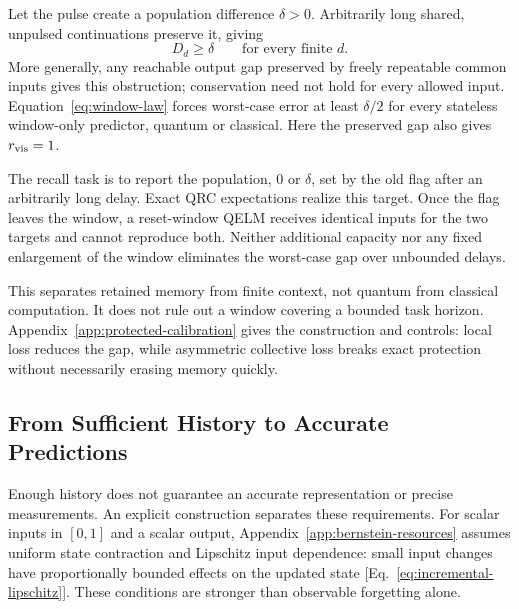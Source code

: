 Let the pulse create a population difference $\delta>0$. Arbitrarily long
shared, unpulsed continuations preserve it, giving
\begin{equation}
 D_d\geq\delta\qquad\text{for every finite }d.
 \label{eq:protected-mode}
\end{equation}
More generally, any reachable output gap preserved by freely repeatable
common inputs gives this obstruction; conservation need not hold for every
allowed input. Equation~\eqref{eq:window-law} forces worst-case error at
least $\delta/2$ for every stateless window-only predictor, quantum or
classical. Here the preserved gap also gives $r_{\rm vis}=1$.

The recall task is to report the population, $0$ or $\delta$, set by the
old flag after an arbitrarily long delay. Exact QRC expectations realize
this target. Once the flag leaves the window, a reset-window QELM receives
identical inputs for the two targets and cannot reproduce both. Neither
additional capacity nor any fixed enlargement of the window eliminates
the worst-case gap over unbounded delays.

This separates retained memory from finite context, not quantum from
classical computation. It does not rule out a window covering a bounded
task horizon. Appendix~\ref{app:protected-calibration} gives the construction
and controls: local loss reduces the gap, while asymmetric collective loss
breaks exact protection without necessarily erasing memory quickly.

\subsection{From Sufficient History to Accurate Predictions}
\label{sec:finite-resources}

Enough history does not guarantee an accurate representation or precise
measurements. An explicit construction separates these requirements.
For scalar inputs in $[0,1]$ and a scalar output,
Appendix~\ref{app:bernstein-resources} assumes uniform state contraction and
Lipschitz input dependence: small input changes have proportionally bounded
effects on the updated state [Eq.~\eqref{eq:incremental-lipschitz}]. These
conditions are stronger than observable forgetting alone.

